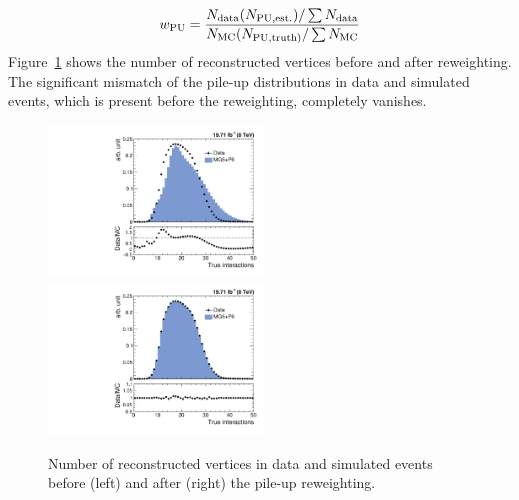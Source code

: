 \begin{equation}
 {w_{\rm PU} = \frac {N_{\rm data} (N_{\rm PU,est.})/\sum N_{\rm data}} {N_{\rm MC} (N_{\rm PU,truth)}/\sum N_{\rm MC}}}
\end{equation}
Figure~\ref{fig:pileup} shows the number of reconstructed vertices before and after reweighting. The significant mismatch of the pile-up distributions in data and simulated events, which is present before the reweighting, completely vanishes. 

\begin{figure}[!htbp]
 \begin{center}
 \includegraphics[width=0.51\textwidth]{Plots_HT_2_150/Nvertices.pdf}%
 ~~\includegraphics[width=0.51\textwidth]{Plots_HT_2_150/Nvertices_weight.pdf}
 \caption{Number of reconstructed vertices in data and simulated events before (left) and after (right) the pile-up reweighting.}
 \label{fig:pileup}
 \end{center}
\end{figure}

